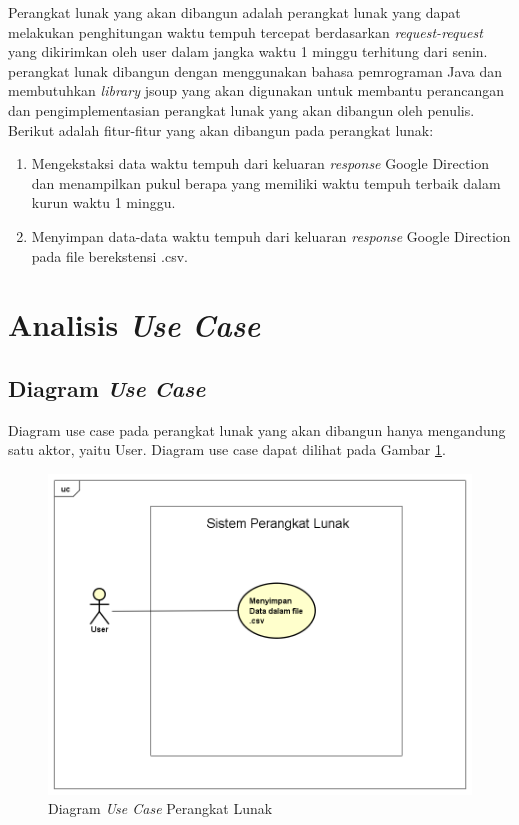 Perangkat lunak yang akan dibangun adalah perangkat lunak yang dapat melakukan penghitungan waktu tempuh tercepat berdasarkan \textit{request-request} yang dikirimkan oleh user dalam jangka waktu 1 minggu terhitung dari senin. perangkat lunak dibangun dengan menggunakan bahasa pemrograman Java dan membutuhkan \textit{library} jsoup yang akan digunakan untuk membantu perancangan dan pengimplementasian perangkat lunak yang akan dibangun oleh penulis. Berikut adalah fitur-fitur yang akan dibangun pada perangkat lunak:

\begin{enumerate}
	\item Mengekstaksi data waktu tempuh dari keluaran \textit{response} Google Direction dan menampilkan pukul berapa yang memiliki waktu tempuh terbaik dalam kurun waktu 1 minggu.
	\item Menyimpan data-data waktu tempuh dari keluaran \textit{response} Google Direction pada file berekstensi .csv.
\end{enumerate}
 
\section{Analisis \textit{Use Case}}
\label{sec:analisisusecase}

\subsection{Diagram \textit{Use Case}}
\label{subsec:diagramusecase}

Diagram use case pada perangkat lunak yang akan dibangun hanya mengandung satu aktor, yaitu User. Diagram use case dapat dilihat pada Gambar \ref{fig:diagramusecase}.

\begin{figure}[H]
				\centering		
				\includegraphics[scale=0.45]{Gambar/UseCaseDiagram.png}
				\caption[Diagram \textit{Use Case} Perangkat Lunak]{Diagram \textit{Use Case} Perangkat Lunak}
				\label{fig:diagramusecase}	
			\end{figure}
			
